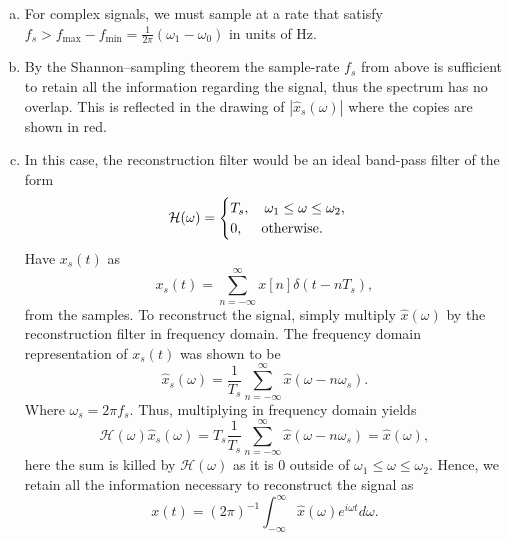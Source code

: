 \begin{enumerate}
\begin{enumerate}[a)]
\item For complex signals, we must sample at a rate that satisfy $f_{s}>f_{\text{max}}-f_{\text{min}}=\frac{1}{2\pi}(\omega_{1}-\omega_{0})$ in units of Hz. 

\item By the Shannon–sampling theorem the sample-rate $f_{s}$ from above is sufficient to retain all the information regarding the signal, thus the spectrum has no overlap. This is reflected in the drawing of $|\hat{x}_{s}(\omega)|$ where the copies are shown in red.

\begin{center}
\end{center}

\item In this case, the reconstruction filter would be an ideal band-pass filter of the form
$$\mathcal{H}(\omega)=\begin{cases}
    T_{s}, \quad \omega_{1}\le\omega\le\omega_{2}, \\
    0, \quad \hspace{0.1cm}\text{otherwise}.
\end{cases}$$
Have $x_{s}(t)$ as
$$x_{s}(t)=\sum_{n=-\infty}^{\infty}x[n]\delta(t-nT_{s}),$$
from the samples. To reconstruct the signal, simply multiply $\hat{x}(\omega)$ by the reconstruction filter in frequency domain. The frequency domain representation of $x_{s}(t)$ was shown to be
$$\hat{x}_{s}(\omega)=\frac{1}{T_{s}}\sum_{n=-\infty}^{\infty}\hat{x}(\omega-n\omega_{s}).$$
Where $\omega_{s}=2\pi f_{s}$. Thus, multiplying in frequency domain yields
$$\mathcal{H}(\omega)\hat{x}_{s}(\omega)=T_{s}\frac{1}{T_{s}}\sum_{n=-\infty}^{\infty}\hat{x}(\omega-n\omega_{s})=\hat{x}(\omega),$$
here the sum is killed by $\mathcal{H}(\omega)$ as it is $0$ outside of $\omega_{1}\le\omega\le\omega_{2}$. Hence, we retain all the information necessary to reconstruct the signal as 
$$x(t)=(2\pi)^{-1}\int_{-\infty}^{\infty}\hat{x}(\omega)e^{i\omega t}d\omega.$$
\end{enumerate}




\end{enumerate}
